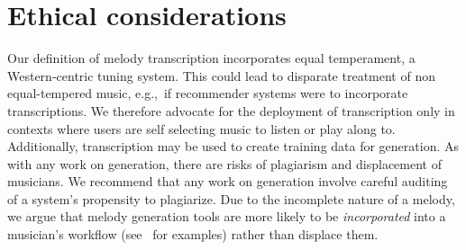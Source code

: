 \vspace{-3mm}
\section{Ethical considerations}

Our definition of melody transcription incorporates equal temperament, a Western-centric tuning system. 
This could lead to disparate treatment of non equal-tempered music, e.g.,~if recommender systems were to incorporate transcriptions.
We therefore advocate for the deployment of transcription only in contexts where users are self selecting music to listen or play along to. 
Additionally, transcription may be used to create training data for generation. 
As with any work on generation, there are risks of plagiarism and displacement of musicians. 
We recommend that any work on generation involve careful auditing of a system's propensity to plagiarize. 
Due to the incomplete nature of a melody, we argue that melody generation tools are more likely to be \emph{incorporated} into a musician's workflow (see~\cite{huang2020ai} for examples) rather than displace them.